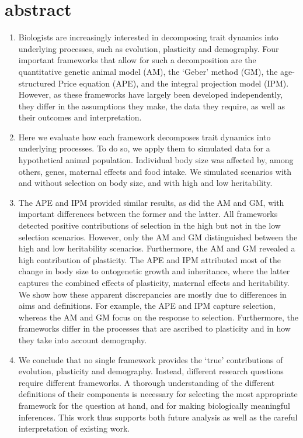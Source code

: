 \section{abstract}
\noindent\begin{enumerate}
\item Biologists are increasingly interested in decomposing trait dynamics into underlying processes, such as evolution, plasticity and demography. Four important frameworks that allow for such a decomposition are the quantitative genetic animal model (AM), the `Geber' method (GM), the age-structured Price equation (APE), and the integral projection model (IPM). However, as these frameworks have largely been developed independently, they differ in the assumptions they make, the data they require, as well as their outcomes and interpretation. 
\item Here we evaluate how each framework decomposes trait dynamics into underlying processes. To do so, we apply them to simulated data for a hypothetical animal population. Individual body size was affected by, among others, genes, maternal effects and food intake. We simulated scenarios with and without selection on body size, and with high and low heritability. 
\item The APE and IPM provided similar results, as did the AM and GM, with important differences between the former and the latter. All frameworks detected positive contributions of selection in the high but not in the low selection scenarios. However, only the AM and GM distinguished between the high and low heritability scenarios. Furthermore, the AM and GM revealed a high contribution of plasticity. The APE and IPM attributed most of the change in body size to ontogenetic growth and inheritance, where the latter captures the combined effects of plasticity, maternal effects and heritability. We show how these apparent discrepancies are mostly due to differences in aims and definitions. For example, the APE and IPM capture selection, whereas the AM and GM focus on the response to selection. Furthermore, the frameworks differ in the processes that are ascribed to plasticity and in how they take into account demography.
\item We conclude that no single framework provides the `true' contributions of evolution, plasticity and demography. Instead, different research questions require different frameworks. A thorough understanding of the different definitions of their components is necessary for selecting the most appropriate framework for the question at hand, and for making biologically meaningful inferences. This work thus supports both future analysis as well as the careful interpretation of existing work.

\end{enumerate}

